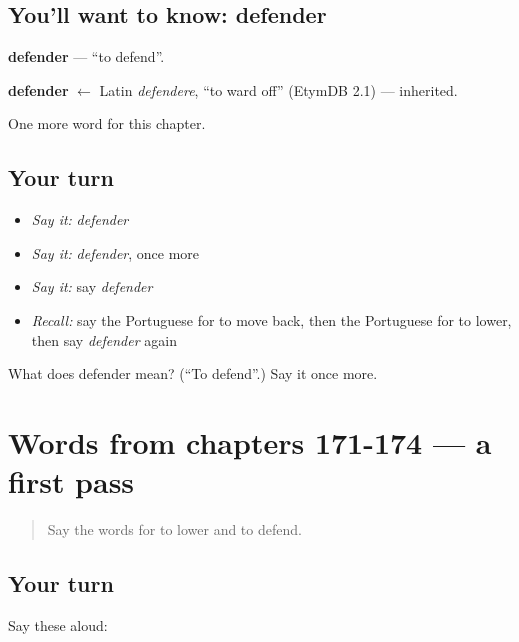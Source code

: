 \subsection*{You'll want to know: defender}
\textbf{defender} — \textquotedblleft{}to defend\textquotedblright{}.

\begin{cousinweb}
\textbf{defender} $\leftarrow$ Latin \emph{defendere}, \textquotedblleft{}to ward off\textquotedblright{} (EtymDB 2.1) — inherited.
\end{cousinweb}

\begin{grammarlens}[title={What you've built}]
One more word for this chapter.
\end{grammarlens}

\subsection*{Your turn}
\begin{itemize}
\raggedright
  \item \emph{Say it:} \emph{defender}
  \item \emph{Say it:} \emph{defender}, once more
  \item \emph{Say it:} say \emph{defender}
  \item \emph{Recall:} say the Portuguese for to move back, then the Portuguese for to lower, then say \emph{defender} again
\end{itemize}

\begin{tcolorbox}[breakable,colback=teal!4,colframe=teal!35!black,title={Before you move on}]
What does defender mean? (\textquotedblleft{}To defend\textquotedblright{}.) Say it once more.
\end{tcolorbox}
\section[(dialogue)]{Words from chapters 171-174 — a first pass}

\label{lesson:PT-R179-first-pass-words-from-chapters-171-174}



\begin{quote}
Say the words for to lower and to defend.
\end{quote}

\subsection*{Your turn}
Say these aloud:

